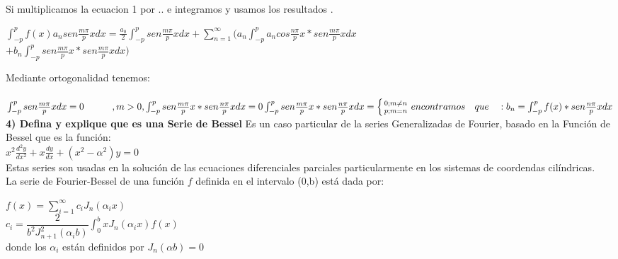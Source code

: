 \documentclass[10pt,a4paper]{article}
\begin{document}
Si multiplicamos la ecuacion 1 por .. e integramos y usamos los resultados .\\
\begin{center}
$\displaystyle{ \int _{ -p }^{ p }{ f(x){ a }_{ n }sen\frac { m\pi  }{ p } xdx } =\frac { { a }_{ 0 } }{ 2 } \int _{ -p }^{ p }{ sen\frac { m\pi  }{ p } x } dx+\sum _{ n=1 }^{ \infty  }{ ({ a }_{ n }\int _{ -p }^{ p }{ { a }_{ n }cos\frac { n\pi  }{ p } x*sen\frac { m\pi  }{ p } x } dx}}$\\
$\displaystyle{+{ b }_{ n }\int _{ -p }^{ p }{ sen\frac { m\pi  }{ p } x*sen\frac { m\pi  }{ p } x } dx) } $
\end{center}
Mediante ortogonalidad tenemos:\\\\
$\int _{ -p }^{ p }{ sen\frac { m\pi  }{ p }  } xdx=0\quad \quad \quad ,m>0,\int _{ -p }^{ p }{ sen\frac { m\pi  }{ p }  } x*sen\frac { n\pi  }{ p } xdx=0\\\\
\int _{ -p }^{ p }{ sen\frac { m\pi  }{ p }  } x*sen\frac { n\pi  }{ p } xdx= \left\{ {0 ;  m \neq n \atop p ; m=n} \right.\\\\
encontramos\quad que\quad :\\ b_n=\int _{ -p }^{ p }{ f(x)*sen\frac { n\pi  }{ p }  } xdx$\\
\textbf{4) Defina y explique que es una Serie de Bessel}
Es un caso particular de la series Generalizadas de Fourier, basado en la Función de Bessel que es la función: \\
${x^2 \frac{d^2 y}{dx^2} + x \frac{dy}{dx} + (x^2 - \alpha^2)y = 0}$\\
Estas series son usadas en la solución de las ecuaciones diferenciales parciales particularmente en los sistemas de coordendas cilíndricas.\\

La serie de Fourier-Bessel de una función $f$ definida en el intervalo (0,b) está dada por: \\
\begin{center}
 $\displaystyle{f(x) = \sum_{i = 1}^{\infty} c_i J_n (\alpha_i x)}$ \\
 $\displaystyle{c_i = \dfrac{2}{b^2 J^2_{n+1} (\alpha_i b)} \int_{0}^{b} x J_n (\alpha _i x) f(x)}$\\
 donde los $\alpha_i$ están definidos por $J_n (\alpha b) = 0$\\
 \end{center} 
\end{document}

